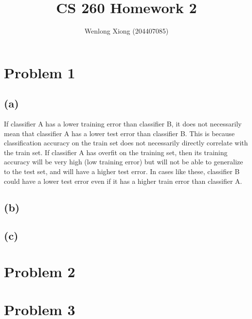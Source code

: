 \documentclass[11pt]{article}
\begin{document}
\author{Wenlong Xiong (204407085)}
\title{CS 260 Homework 2}
\maketitle


\section{Problem 1}
\subsection{(a)}
 If classifier A has a lower training error than classifier B, it does not necessarily mean that classifier A has a lower test error than classifier B. This is because classification accuracy on the train set does not necessarily directly correlate with the train set. If classifier A has overfit on the training set, then its training accuracy will be very high (low training error) but will not be able to generalize to the test set, and will have a higher test error. In cases like these, classifier B could have a lower test error even if it has a higher train error than classifier A.

\subsection{(b)}


\subsection{(c)}


\section{Problem 2}

\section{Problem 3}
\end{document}
